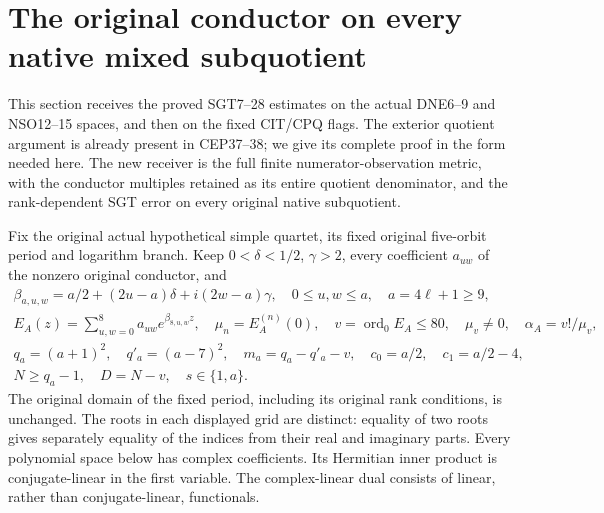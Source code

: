 \documentclass[11pt,a4paper]{article}
\begin{document}
\label{MPBUILD:FIRST_ROW_MIXED_GAMMA:end}
\label{MTBUILD:FMG_COMPLETE_PREREQUISITE:end}

\clearpage
\label{MTBUILD:NCT_COMPLETE_PREREQUISITE:start}
\clearpage
\label{MPBUILD:NATIVE_CONDUCTOR_SUBQUOTIENT_TRANSFER:start}
\begingroup
\providecommand{\im}{\operatorname{im}}
\providecommand{\rank}{\operatorname{rank}}
\section{The original conductor on every native mixed subquotient}
\label{sec:NCT}

This section receives the proved SGT7--28 estimates on the actual
DNE6--9 and NSO12--15 spaces, and then on the fixed CIT/CPQ flags.
The exterior quotient argument is already present in CEP37--38;
we give its complete proof in the form needed here.  The new receiver
is the full finite numerator-observation metric, with the conductor
multiples retained as its entire quotient denominator, and the
rank-dependent SGT error on every original native subquotient.

Fix the original actual hypothetical simple quartet, its fixed original
five-orbit period and logarithm branch.  Keep
\(0<\delta<1/2\), \(\gamma>2\), every coefficient \(a_{uw}\)
of the nonzero original conductor, and
\[
\begin{gathered}
 \beta_{a,u,w}=a/2+(2u-a)\delta+i(2w-a)\gamma,
 \quad 0\le u,w\le a,\quad a=4\ell+1\ge9,\\
 E_A(z)=\sum_{u,w=0}^{8}a_{uw}e^{\beta_{8,u,w}z},\quad
 \mu_n=E_A^{(n)}(0),\quad v=\operatorname{ord}_0 E_A\le80,
 \quad \mu_v\ne0,\quad \alpha_A=v!/\mu_v,\\
 q_a=(a+1)^2,\quad q'_a=(a-7)^2,\quad m_a=q_a-q'_a-v,
 \quad c_0=a/2,\quad c_1=a/2-4,\\
 N\ge q_a-1,\quad D=N-v,\quad s\in\{1,a\}.
\end{gathered}\tag{NCT1}
\]
The original domain of the fixed period, including its original rank
conditions, is unchanged.  The roots in each displayed grid are
distinct: equality of two roots gives separately equality of the
indices from their real and imaginary parts.  Every polynomial
space below has complex coefficients.  Its Hermitian inner product
is conjugate-linear in the first variable.  The complex-linear dual
consists of linear, rather than conjugate-linear, functionals.
\end{document}
